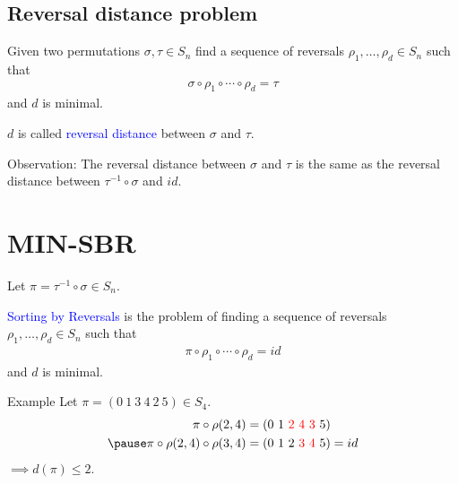 \documentclass{beamer}
\theoremstyle{definition}
\def\padding{\vspace{0.5cm}}
\def\spadding{\vspace{0.25cm}}
\def\b{\textcolor{blue}}
\def\r{\textcolor{red}}
\begin{document}
\subsection{Reversal distance problem}

\begin{frame}

\begin{definition}
Given two permutations $\sigma, \tau \in S_n$ find a sequence of reversals $\rho_1, \dots, \rho_d \in S_n$ such that
\begin{align*}
    \sigma \circ \rho_1 \circ \cdots \circ \rho_d = \tau
\end{align*}
and $d$ is minimal. \pause\par\spadding
$d$ is called \b{reversal distance} between $\sigma$ and $\tau$.
\end{definition}\pause\padding

Observation: The reversal distance between $\sigma$ and $\tau$ is the same as the reversal distance between $\tau^{-1} \circ \sigma$ and $id$.

\end{frame}

\section{MIN-SBR}

\begin{frame}

\begin{definition}
Let $\pi = \tau^{-1} \circ \sigma \in S_n$. \par\pause
\b{Sorting by Reversals} is the problem of finding a sequence of reversals $\rho_1, \dots, \rho_d \in S_n$ such that
\begin{align*}
    \pi \circ \rho_1 \circ \cdots \circ \rho_d = id
\end{align*}
and $d$ is minimal.
\end{definition}\pause

\begin{exampleblock}{Example}
Let $\pi = (0\ 1\ 3\ 4\ 2\ 5) \in S_4$.\pause
\begin{align*}
    \pi \circ \rho(2,4) &= (0\ 1\ \r{2\ 4\ 3}\ 5) \\ \pause
    \pi \circ \rho(2,4) \circ \rho(3,4) &= (0\ 1\ 2\ \r{3\ 4}\ 5) = id
\end{align*}\pause
$\implies d(\pi) \leq 2$.
\end{exampleblock}

\end{frame}
\end{document}
